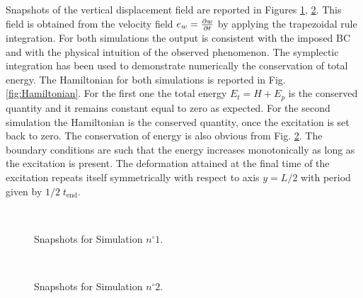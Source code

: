 \documentclass[preprint,12pt]{elsarticle}
\begin{document}
{Snapshots of the vertical displacement field are reported in Figures \ref{fig:sim1}, \ref{fig:sim2}. This field is obtained from the velocity field $e_w = \diffp{w}{t}$ by applying the trapezoidal rule integration. For both simulations the output is consistent with the imposed BC and with the physical intuition of the observed phenomenon. The symplectic integration has been used to demonstrate numerically the conservation of total energy. The Hamiltonian for both simulations is reported in Fig. \ref{fig:Hamiltonian}. For the first one the total energy $E_t = H + E_p$ is the conserved quantity and it remains constant equal to zero as expected. For the second simulation the Hamiltonian is the conserved quantity, once the excitation is set back to zero. The conservation of energy is also obvious from Fig. \ref{fig:sim2}. The boundary conditions are such that the energy increases monotonically as long as the excitation is present.  The deformation attained at the final time of the excitation  repeats itself symmetrically with respect to axis $y = L/2$ with period given by $1/2 \; t_{\text{end}}$.
} 

\begin{figure}[t]%
	\centering
	\hspace{8pt}%
	 \\
	\hspace{8pt}%
	\caption[Snapshots of the displacement field]{Snapshots for Simulation $n^\circ 1$.}%
	\label{fig:sim1}%
\end{figure}
\begin{figure}[h]%
	\centering
	\hspace{8pt}%
	 \\
	\hspace{8pt}%
	\caption[Snapshots of the displacement field]{Snapshots for Simulation $n^\circ 2$.}%
	\label{fig:sim2}%
\end{figure}
\end{document}
